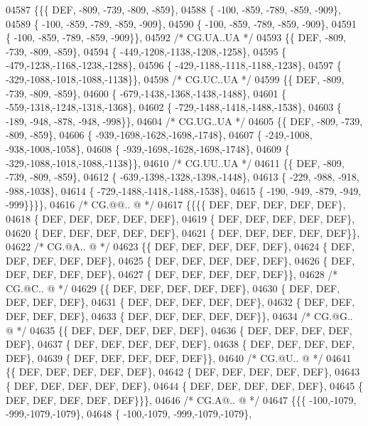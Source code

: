 \begin{DoxyCode}
04587 \{\{\{  DEF, -809, -739, -809, -859\},
04588 \{ -100, -859, -789, -859, -909\},
04589 \{ -100, -859, -789, -859, -909\},
04590 \{ -100, -859, -789, -859, -909\},
04591 \{ -100, -859, -789, -859, -909\}\},
04592 \textcolor{comment}{/* CG.UA..UA */}
04593 \{\{  DEF, -809, -739, -809, -859\},
04594 \{ -449,-1208,-1138,-1208,-1258\},
04595 \{ -479,-1238,-1168,-1238,-1288\},
04596 \{ -429,-1188,-1118,-1188,-1238\},
04597 \{ -329,-1088,-1018,-1088,-1138\}\},
04598 \textcolor{comment}{/* CG.UC..UA */}
04599 \{\{  DEF, -809, -739, -809, -859\},
04600 \{ -679,-1438,-1368,-1438,-1488\},
04601 \{ -559,-1318,-1248,-1318,-1368\},
04602 \{ -729,-1488,-1418,-1488,-1538\},
04603 \{ -189, -948, -878, -948, -998\}\},
04604 \textcolor{comment}{/* CG.UG..UA */}
04605 \{\{  DEF, -809, -739, -809, -859\},
04606 \{ -939,-1698,-1628,-1698,-1748\},
04607 \{ -249,-1008, -938,-1008,-1058\},
04608 \{ -939,-1698,-1628,-1698,-1748\},
04609 \{ -329,-1088,-1018,-1088,-1138\}\},
04610 \textcolor{comment}{/* CG.UU..UA */}
04611 \{\{  DEF, -809, -739, -809, -859\},
04612 \{ -639,-1398,-1328,-1398,-1448\},
04613 \{ -229, -988, -918, -988,-1038\},
04614 \{ -729,-1488,-1418,-1488,-1538\},
04615 \{ -190, -949, -879, -949, -999\}\}\}\},
04616 \textcolor{comment}{/* CG.@@.. @ */}
04617 \{\{\{\{  DEF,  DEF,  DEF,  DEF,  DEF\},
04618 \{  DEF,  DEF,  DEF,  DEF,  DEF\},
04619 \{  DEF,  DEF,  DEF,  DEF,  DEF\},
04620 \{  DEF,  DEF,  DEF,  DEF,  DEF\},
04621 \{  DEF,  DEF,  DEF,  DEF,  DEF\}\},
04622 \textcolor{comment}{/* CG.@A.. @ */}
04623 \{\{  DEF,  DEF,  DEF,  DEF,  DEF\},
04624 \{  DEF,  DEF,  DEF,  DEF,  DEF\},
04625 \{  DEF,  DEF,  DEF,  DEF,  DEF\},
04626 \{  DEF,  DEF,  DEF,  DEF,  DEF\},
04627 \{  DEF,  DEF,  DEF,  DEF,  DEF\}\},
04628 \textcolor{comment}{/* CG.@C.. @ */}
04629 \{\{  DEF,  DEF,  DEF,  DEF,  DEF\},
04630 \{  DEF,  DEF,  DEF,  DEF,  DEF\},
04631 \{  DEF,  DEF,  DEF,  DEF,  DEF\},
04632 \{  DEF,  DEF,  DEF,  DEF,  DEF\},
04633 \{  DEF,  DEF,  DEF,  DEF,  DEF\}\},
04634 \textcolor{comment}{/* CG.@G.. @ */}
04635 \{\{  DEF,  DEF,  DEF,  DEF,  DEF\},
04636 \{  DEF,  DEF,  DEF,  DEF,  DEF\},
04637 \{  DEF,  DEF,  DEF,  DEF,  DEF\},
04638 \{  DEF,  DEF,  DEF,  DEF,  DEF\},
04639 \{  DEF,  DEF,  DEF,  DEF,  DEF\}\},
04640 \textcolor{comment}{/* CG.@U.. @ */}
04641 \{\{  DEF,  DEF,  DEF,  DEF,  DEF\},
04642 \{  DEF,  DEF,  DEF,  DEF,  DEF\},
04643 \{  DEF,  DEF,  DEF,  DEF,  DEF\},
04644 \{  DEF,  DEF,  DEF,  DEF,  DEF\},
04645 \{  DEF,  DEF,  DEF,  DEF,  DEF\}\}\},
04646 \textcolor{comment}{/* CG.A@.. @ */}
04647 \{\{\{ -100,-1079, -999,-1079,-1079\},
04648 \{ -100,-1079, -999,-1079,-1079\},

\end{DoxyCode}
